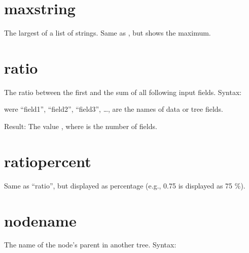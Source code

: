 \documentclass[letterpaper,10pt,english]{sphinxmanual}
\begin{document}
\section{max\sphinxhyphen{}string}
\label{\detokenize{tree-fields:max-string}}
\sphinxAtStartPar
The largest of a list of strings.
Same as , but shows the maximum.


\section{ratio}
\label{\detokenize{tree-fields:ratio}}
\sphinxAtStartPar
The ratio between the first and the sum of all following input fields.
Syntax:

\begin{sphinxVerbatim}[commandchars=\\\{\}]
 
     
     \PYG{p}{[}  \PYG{p}{]}
     \PYG{p}{[} \PYG{p}{]}
     \PYG{p}{[}\PYG{p}{]}
     \PYG{p}{[}\PYG{p}{]}
\end{sphinxVerbatim}

\sphinxAtStartPar
were “field1”, “field2”, “field3”, …, are the names of data or tree fields.

\sphinxAtStartPar
Result: The value , where  is the number of fields.


\section{ratio\sphinxhyphen{}percent}
\label{\detokenize{tree-fields:ratio-percent}}
\sphinxAtStartPar
Same as “ratio”, but displayed as percentage (e.g., 0.75 is displayed as 75 \%).


\section{node\sphinxhyphen{}name}
\label{\detokenize{tree-fields:node-name}}
\sphinxAtStartPar
The name of the node’s parent in another tree.
Syntax:
\end{document}
